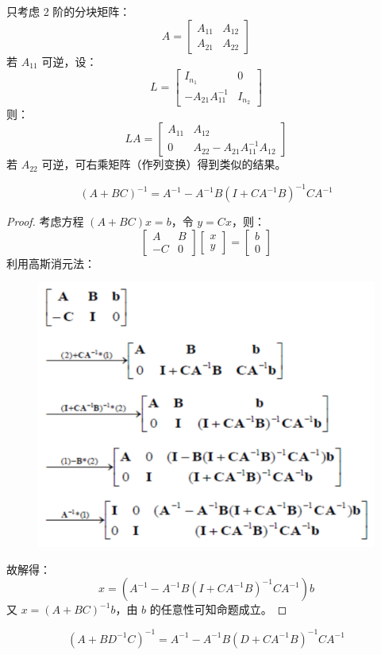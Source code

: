 \begin{definition}
只考虑 2 阶的分块矩阵：
\[
    A=\begin{bmatrix}A_{11}&A_{12}\\A_{21}&A_{22}\end{bmatrix}
\]
若 $A_{11}$ 可逆，设：
\[
    L=\begin{bmatrix}I_{n_1}&0\\-A_{21}A_{11}^{-1}&I_{n_2}\end{bmatrix}
\]
则：
\[
    LA=\begin{bmatrix}A_{11}&A_{12}\\0&A_{22}-A_{21}A_{11}^{-1}A_{12}\end{bmatrix}
\]
若 $A_{22}$ 可逆，可右乘矩阵（作列变换）得到类似的结果。
\end{definition}

\begin{lemma}
\[
    (A+BC)^{-1}=A^{-1}-A^{-1}B(I+CA^{-1}B)^{-1}CA^{-1}
\]
\end{lemma}
\begin{proof}
考虑方程 $(A+BC)x=b$，令 $y=Cx$，则：
\[
    \begin{bmatrix}A&B\\-C&0\end{bmatrix}\begin{bmatrix}x\\y\end{bmatrix}=\begin{bmatrix}b\\0\end{bmatrix}
\]
利用高斯消元法：
\begin{figure}[H]
    \centering
    \includegraphics[width=0.5\linewidth]{figs/gauss.png}
\end{figure}
故解得：
\[
    x=(A^{-1}-A^{-1}B(I+CA^{-1}B)^{-1}CA^{-1})b
\]
又 $x=(A+BC)^{-1}b$，由 $b$ 的任意性可知命题成立。
\end{proof}

\begin{corollary}
\[
    (A+BD^{-1}C)^{-1}=A^{-1}-A^{-1}B(D+CA^{-1}B)^{-1}CA^{-1}
\]
\end{corollary}


